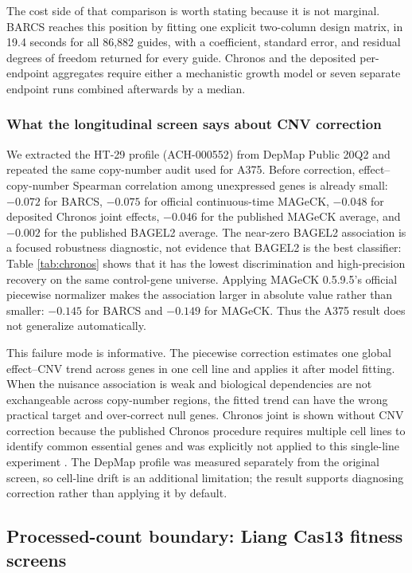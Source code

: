 The cost side of that comparison is worth stating because it is not marginal.
BARCS reaches this position by fitting one explicit two-column design matrix,
in 19.4 seconds for all 86,882 guides, with a coefficient, standard error, and
residual degrees of freedom returned for every guide.  Chronos and the
deposited per-endpoint aggregates require either a mechanistic growth model or
seven separate endpoint runs combined afterwards by a median.

\subsubsection{What the longitudinal screen says about CNV correction}

We extracted the HT-29 profile (ACH-000552) from DepMap Public 20Q2
\citep{depmap20q2} and repeated the same copy-number audit used for A375.
Before correction, effect--copy-number Spearman correlation among unexpressed
genes is already small: $-0.072$ for BARCS, $-0.075$ for official
continuous-time MAGeCK, $-0.048$ for deposited Chronos joint effects,
$-0.046$ for the published MAGeCK average, and $-0.002$ for the published
BAGEL2 average.  The near-zero BAGEL2 association is a focused robustness
diagnostic, not evidence that BAGEL2 is the best classifier: Table
\ref{tab:chronos} shows that it has the lowest discrimination and
high-precision recovery on the same control-gene universe.
Applying MAGeCK 0.5.9.5's official piecewise normalizer makes the association
larger in absolute value rather than smaller: $-0.145$ for BARCS and $-0.149$ for
MAGeCK.  Thus the A375 result does not generalize automatically.

This failure mode is informative.  The piecewise correction estimates one
global effect--CNV trend across genes in one cell line and applies it after
model fitting.  When the nuisance association is weak and biological
dependencies are not exchangeable across copy-number regions, the fitted
trend can have the wrong practical target and over-correct null genes.
Chronos joint is shown without CNV correction because the published Chronos
procedure requires multiple cell lines to identify common essential genes and
was explicitly not applied to this single-line experiment
\citep{dempster2021chronos}.  The DepMap profile was measured separately from
the original screen, so cell-line drift is an additional limitation; the
result supports diagnosing correction rather than applying it by default.

\subsection{Processed-count boundary: Liang Cas13 fitness screens}

